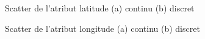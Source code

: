 \begin{figure}[H]
	\centering
	\caption{Scatter de l'atribut latitude (a) continu (b) discret}
	\label{fig:lat}
\end{figure}
\begin{figure}[H]
	\centering
	\caption{Scatter de l'atribut longitude (a) continu (b) discret}
	\label{fig:lon}
\end{figure}